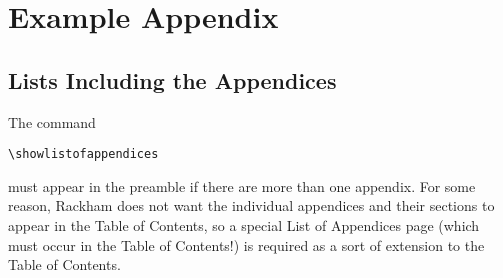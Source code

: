 \chapter{Example Appendix}

\section{Lists Including the Appendices} 
The command 
\begin{verbatim}
\showlistofappendices
\end{verbatim} 
must appear in the preamble if there are more than one appendix.  For
some reason, Rackham does not want the individual appendices and their
sections to appear in the Table of Contents, so a special List of
Appendices page (which must occur in the Table of Contents!) is required
as a sort of extension to the Table of Contents.

